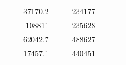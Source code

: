 \begin{table}[H]
\begin{tabular}{|ccrccrccc}
\multicolumn{1}{|c|}{\cellcolor[HTML]{FFFFC7}}                                & \multicolumn{1}{c|}{\cellcolor[HTML]{DAE8FC}}                      & \multicolumn{1}{r|}{\cellcolor[HTML]{DAE8FC}37170.2}   & \multicolumn{1}{c|}{\cellcolor[HTML]{FFFFC7}}                                & \multicolumn{1}{c|}{\cellcolor[HTML]{DAE8FC}}                       & \multicolumn{1}{r|}{\cellcolor[HTML]{DDFDFF}234177}    &                                                                              &                                                                    &                                                        \\ \cline{3-3} \cline{6-6}
\multicolumn{1}{|c|}{\cellcolor[HTML]{FFFFC7}}                                & \multicolumn{1}{c|}{\cellcolor[HTML]{DAE8FC}}                      & \multicolumn{1}{r|}{\cellcolor[HTML]{DDFDFF}108811}    & \multicolumn{1}{c|}{\cellcolor[HTML]{FFFFC7}}                                & \multicolumn{1}{c|}{\cellcolor[HTML]{DAE8FC}}                       & \multicolumn{1}{r|}{\cellcolor[HTML]{DAE8FC}235628}    &                                                                              &                                                                    &                                                        \\ \cline{3-3} \cline{6-6}
\multicolumn{1}{|c|}{\cellcolor[HTML]{FFFFC7}}                                & \multicolumn{1}{c|}{\cellcolor[HTML]{DAE8FC}}                      & \multicolumn{1}{r|}{\cellcolor[HTML]{DAE8FC}62042.7}   & \multicolumn{1}{c|}{\cellcolor[HTML]{FFFFC7}}                                & \multicolumn{1}{c|}{\cellcolor[HTML]{DAE8FC}}                       & \multicolumn{1}{r|}{\cellcolor[HTML]{DDFDFF}488627}    &                                                                              &                                                                    &                                                        \\ \cline{3-3} \cline{6-6}
\multicolumn{1}{|c|}{\cellcolor[HTML]{FFFFC7}}                                & \multicolumn{1}{c|}{\cellcolor[HTML]{DAE8FC}}                      & \multicolumn{1}{r|}{\cellcolor[HTML]{DDFDFF}17457.1}   & \multicolumn{1}{c|}{\cellcolor[HTML]{FFFFC7}}                                & \multicolumn{1}{c|}{\cellcolor[HTML]{DAE8FC}}                       & \multicolumn{1}{r|}{\cellcolor[HTML]{DAE8FC}440451}    &                                                                              &                                                                    &                                                        \\ \cline{3-3} \cline{6-6}

\end{tabular}
\end{table}
